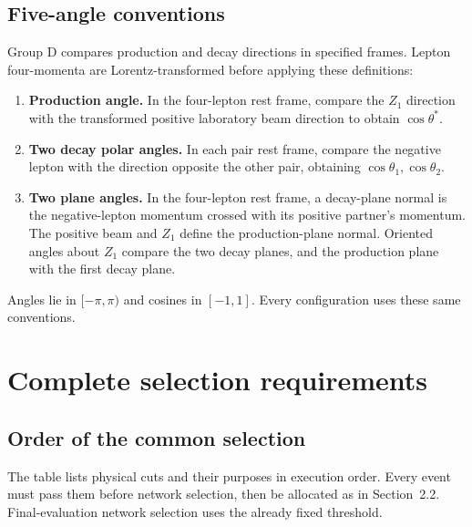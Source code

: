 \documentclass[11pt,a4paper]{article}
\begin{document}
\subsection{Five-angle conventions}
Group D compares production and decay directions in specified frames.
Lepton four-momenta are Lorentz-transformed before applying these definitions:
\begin{enumerate}[leftmargin=1.7em,itemsep=3pt]
\item \textbf{Production angle.} In the four-lepton rest frame, compare the $Z_1$ direction with the transformed positive laboratory beam direction to obtain $\cos\theta^*$.
\item \textbf{Two decay polar angles.} In each pair rest frame, compare the negative lepton with the direction opposite the other pair, obtaining $\cos\theta_1,\cos\theta_2$.
\item \textbf{Two plane angles.} In the four-lepton rest frame, a decay-plane normal is the negative-lepton momentum crossed with its positive partner's momentum. The positive beam and $Z_1$ define the production-plane normal. Oriented angles about $Z_1$ compare the two decay planes, and the production plane with the first decay plane.
\end{enumerate}
Angles lie in $[-\pi,\pi)$ and cosines in $[-1,1]$.
Every configuration uses these same conventions.
\FloatBarrier

\section{Complete selection requirements}\label{app:cuts}

\subsection{Order of the common selection}
The table lists physical cuts and their purposes in execution order.
Every event must pass them before network selection, then be allocated as in Section~2.2.
Final-evaluation network selection uses the already fixed threshold.
\end{document}
